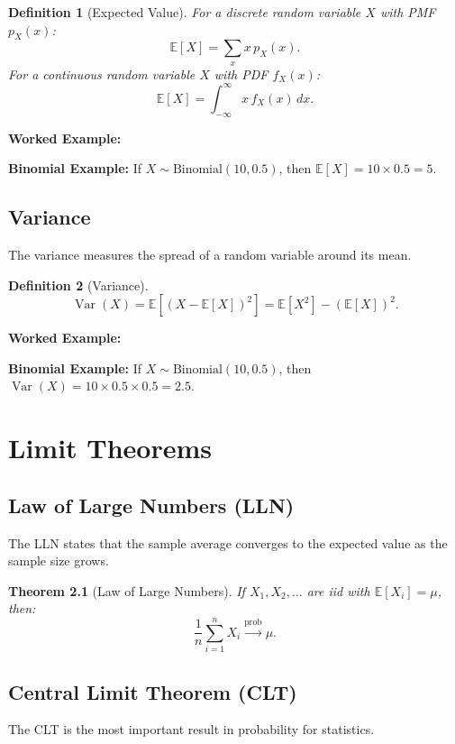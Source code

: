 \documentclass[12pt,a4paper,oneside]{report}
\theoremstyle{mytheorem}
\newtheorem{theorem}{Theorem}[chapter]
\theoremstyle{mydefinition}
\newtheorem{definition}[theorem]{Definition}
\theoremstyle{myremark}
\newenvironment{worked}{%
  \par\medskip\noindent\textbf{\color{myorange}Worked Example:}\par\smallskip
}{%
  \par\medskip
}
\newcommand{\E}{\mathbb{E}}
\DeclareMathOperator{\Var}{Var}
\begin{document}
\begin{definition}[Expected Value]
For a discrete random variable $X$ with PMF $p_X(x)$:
\[
\E[X] = \sum_x x \, p_X(x).
\]
For a continuous random variable $X$ with PDF $f_X(x)$:
\[
\E[X] = \int_{-\infty}^{\infty} x \, f_X(x)\,dx.
\]
\end{definition}

\begin{worked}
\textbf{Binomial Example:}
If $X \sim \text{Binomial}(10, 0.5)$, then $\E[X] = 10 \times 0.5 = 5$.
\end{worked}

\section{Variance}
The variance measures the spread of a random variable around its mean.

\begin{definition}[Variance]
\[
\Var(X) = \E[(X - \E[X])^2] = \E[X^2] - (\E[X])^2.
\]
\end{definition}

\begin{worked}
\textbf{Binomial Example:}
If $X \sim \text{Binomial}(10, 0.5)$, then $\Var(X) = 10 \times 0.5 \times 0.5 = 2.5$.
\end{worked}

\chapter{Limit Theorems}

\section{Law of Large Numbers (LLN)}
The LLN states that the sample average converges to the expected value as the sample size grows.

\begin{theorem}[Law of Large Numbers]
If $X_1, X_2, \ldots$ are iid with $\E[X_i] = \mu$, then:
\[
\frac{1}{n}\sum_{i=1}^n X_i \xrightarrow{\text{prob}} \mu.
\]
\end{theorem}

\section{Central Limit Theorem (CLT)}
The CLT is the most important result in probability for statistics.
\end{document}
